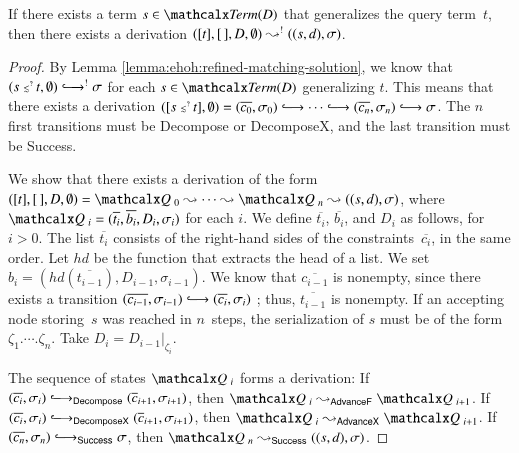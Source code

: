 \begin{lemma}\label{lemma:ehoh:pdt-complete-help}
  If there exists a term $s \in \Term(D)$ that generalizes the query term~$t$,
  then there exists a derivation $([t], [\,],\allowbreak D,\allowbreak \emptyset) \leadsto^! ((s, d),
  \sigma)$. %
  \end{lemma}
  \begin{proof}
    By Lemma \ref{lemma:ehoh:refined-matching-solution}, we know that $(s \MATCH t,
    \emptyset) \Matchiiarrow^! \sigma$ for each $s \in \Term(D)$ generalizing $t$.
    This means that there exists a derivation
    $([s \MATCH t], \emptyset) = (\overline{c_0}, \sigma_0) \Matchiiarrow \cdots \Matchiiarrow (\overline{c_n}, \sigma_n)\allowbreak \Matchiiarrow \sigma$.
    The $n$ first transitions must be \textsf{Decompose} or \textsf{DecomposeX},
    and the last transition must be \textsf{Success}.

    We show that there exists a derivation of the form
    $([t], [\,],\allowbreak D, \emptyset) = \quadruple{}_{\,\,0}\allowbreak \Pdtarrow \cdots
    \Pdtarrow \quadruple{}_{\,\,n} \Pdtarrow ((s, d),\sigma)$, where $\quadruple{}_{\,\,i} =
    (\overline{t_i}, \overline{b_i}, \allowbreak D_i, \sigma_i)$ for each $i$.
    We define $\overline{t_i}$, $\overline{b_i}$, and $D_i$ as follows, for $i > 0$.
    The list $\overline{t_i}$ consists of the right-hand sides of the
    constraints~$\overline{c_i}$, in the same order.
    Let $\mathit{hd}$ be the function that extracts the head of a list. We set
          $b_i = (\mathit{hd}(\overline{t_{i-1}}),\allowbreak D_{i-1}, \sigma_{i-1})$. We know that $\overline{c_{i-1}}$ is
          nonempty, since there exists a transition $(\overline{c_{i-1}}, \sigma_{i-1}) \Matchiiarrow (\overline{c_i}, \sigma_i)$%
          ; thus, $\overline{t_{i-1}}$ is nonempty.
    If an accepting node storing~$s$ was reached in $n$~steps, the
      serialization of $s$ must be of the form $\zeta_1.\cdots.\zeta_n$. Take $D_i
      = D_{i-1}{|}_{\zeta_i}$.
  
    The sequence of states $\quadruple{}_{\,\,i}$ forms a
    derivation:
    If $(\overline{c_i},\allowbreak \sigma_i)\allowbreak \Matchiiarrow_\textsf{Decompose}
    (\tuple{c}{{i+1}},\allowbreak \sigma_{i+1})$, then $\quadruple{}_{\,\,i}
    \Pdtarrow_\textsf{AdvanceF} \allowbreak \quadruple{}_{\,\,i+1}$.
    If $(\overline{c_i},\allowbreak \sigma_i) \Matchiiarrow_\textsf{DecomposeX}
    (\tuple{c}{{i+1}},\allowbreak \sigma_{i+1})$, then $\quadruple{}_{\,\,i}
    \Pdtarrow_\textsf{AdvanceX} \quadruple{}_{\,\,i+1}$.
    If $(\overline{c_n},\allowbreak \sigma_n) \Matchiiarrow_\textsf{Success} \sigma$, then
    $\quadruple{}_{\,\,n} \Pdtarrow_\textsf{Success} ((s, d),\allowbreak \sigma)$.
\end{proof}
  
